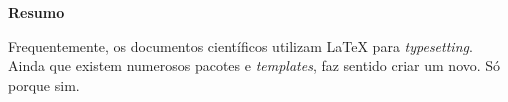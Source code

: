 
\cleardoublepage\thispagestyle{plain}

\begin{otherlanguage}{portuguese}
  \textbf{\Large Resumo}

  Frequentemente, os documentos científicos utilizam \LaTeX{} para
  \emph{typesetting}. Ainda que existem numerosos pacotes e
  \emph{templates}, faz sentido criar um novo. Só porque sim.
\end{otherlanguage}
